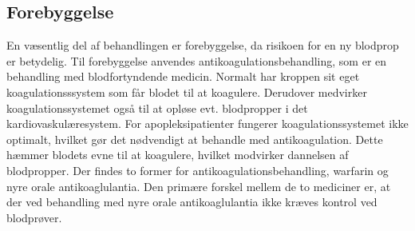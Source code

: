 \subsection{Forebyggelse}
En væsentlig del af behandlingen er forebyggelse, da risikoen for en ny blodprop er betydelig. Til forebyggelse anvendes antikoagulationsbehandling, som er en behandling med blodfortyndende medicin. Normalt har kroppen sit eget koagulationsssystem som får blodet til at koagulere. Derudover medvirker koagulationssystemet også til at opløse evt. blodpropper i det kardiovaskulæresystem. For apopleksipatienter fungerer koagulationssystemet ikke optimalt, hvilket gør det nødvendigt at behandle med antikoagulation. Dette hæmmer blodets evne til at koagulere, hvilket modvirker dannelsen af blodpropper. Der findes to former for antikoagulationsbehandling, warfarin og nyre orale antikoaglulantia. Den primære forskel mellem de to mediciner er, at der ved behandling med nyre orale antikoaglulantia ikke kræves kontrol ved blodprøver.\cite{Kjaergaard2015}

